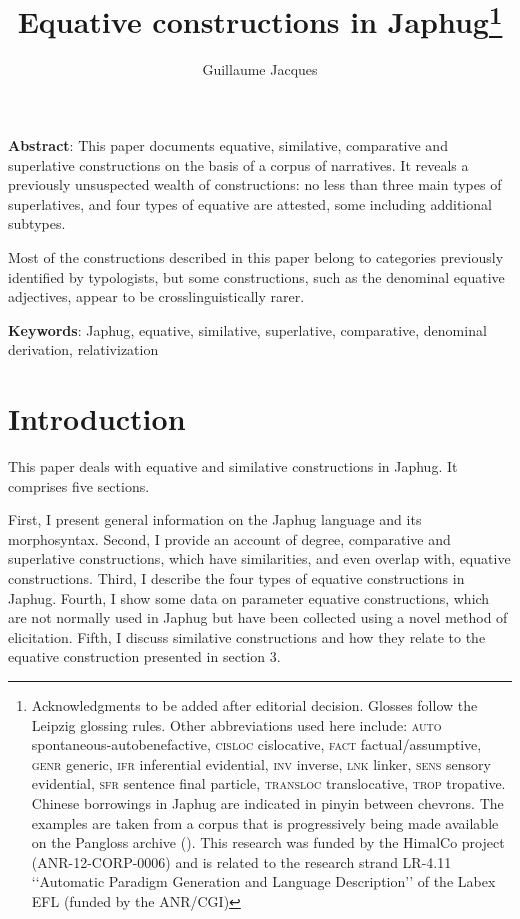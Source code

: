 \documentclass[oneside,a4paper,11pt]{article}
\begin{document}
 
\title{Equative constructions in Japhug\footnote{Acknowledgments to be added after editorial decision. Glosses follow the Leipzig glossing rules. Other abbreviations used here include: \textsc{auto} spontaneous-autobenefactive, \textsc{cisloc} cislocative,  \textsc{fact} factual/assumptive, \textsc{genr} generic, \textsc{ifr} inferential evidential,  \textsc{inv} inverse, \textsc{lnk} linker,  \textsc{sens} sensory  evidential, \textsc{sfr} sentence final particle, \textsc{transloc} translocative, \textsc{trop} tropative.  Chinese borrowings in Japhug are indicated in pinyin between chevrons. The examples are taken from a corpus that is progressively being made available on the Pangloss archive (\citealt{michailovsky14pangloss}). This research was funded by the HimalCo project (ANR-12-CORP-0006) and is related to the research strand LR-4.11 ‘‘Automatic Paradigm Generation and Language Description’’ of the Labex EFL (funded by the ANR/CGI) }}
\author{Guillaume Jacques}
\maketitle
\linenumbers

\textbf{Abstract}: This paper documents equative, similative, comparative and superlative constructions on the basis of a corpus of narratives. It reveals a previously unsuspected wealth of constructions: no less than three main types of superlatives, and four types of equative are attested, some including additional subtypes.

Most of the constructions described in this paper belong to categories previously identified by typologists, but some constructions, such as the denominal equative adjectives, appear to be crosslinguistically rarer.

\textbf{Keywords}: Japhug, equative, similative, superlative, comparative, denominal derivation, relativization
\section*{Introduction}
This paper deals with equative and similative constructions in Japhug. It comprises five sections.

 First, I present general information on the Japhug language and its morphosyntax. Second, I provide an account of degree, comparative and superlative constructions, which have similarities, and even overlap with, equative constructions. Third, I describe the four types of equative constructions in Japhug. Fourth, I show some data on parameter equative constructions, which are not normally used in Japhug but have been collected using a novel method of elicitation.  Fifth, I discuss similative constructions and how they relate to the equative construction presented in section 3.
\end{document}
